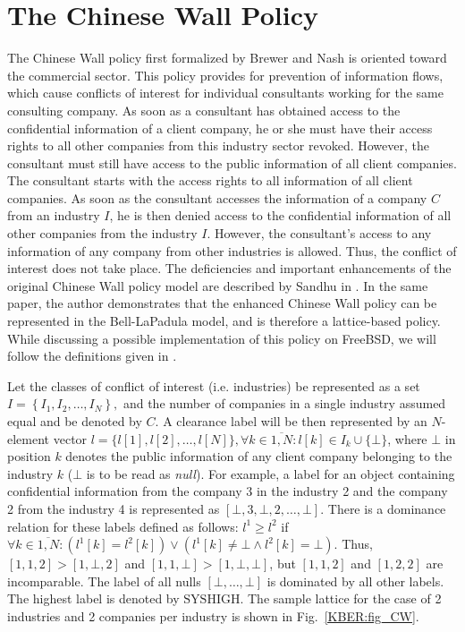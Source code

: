 \documentclass[10pt,a4paper,conference,onecolumn]{IEEEtran}
\newcommand{\KBERcode}[1]{\textsl{#1}}
\begin{document}
\section{The Chinese Wall Policy}

The Chinese Wall policy first formalized by Brewer and Nash \cite{DBLP:conf/sp/BrewerN89}
is oriented toward the commercial sector. This policy provides for prevention of
information flows, which cause conflicts of interest for individual consultants
working for the same consulting company. As soon as a consultant has obtained
access to the confidential information of a client company, he or she must 
have their access rights to all other companies from this industry sector 
revoked. However, the consultant must still have access to the public 
information of all client companies. The consultant starts with the access
rights to all information of all client companies. As soon as the consultant
accesses the information of a company $C$ from an industry $I$, he is then
denied access to the confidential information of all other companies from the
industry $I$. However, the consultant's access to any information of any
company from other industries is allowed. Thus, the conflict of interest does not take 
place. The deficiencies and important enhancements of the original Chinese Wall
policy model are described by Sandhu in \cite{DBLP:journals/compsec/Sandhu92}. In the same paper,
the author demonstrates that the enhanced Chinese Wall policy can be 
represented in the Bell-LaPadula model, and is therefore a lattice-based
policy. While discussing a possible implementation of this policy on FreeBSD,
we will follow the definitions given in \cite{DBLP:journals/computer/Sandhu93}.

Let the classes of conflict of interest (i.e. industries) be represented 
as a set $I=\left\{I_1, I_2, \ldots, I_N\right\},$ and the number of 
companies in a single industry assumed equal and be denoted by $C$. 
A clearance label will be then represented by an $N$-element vector 
$l=\{l[1], l[2], \ldots, l[N]\}, \forall{}k\in \overline{1,N}: l[k]\in I_k\cup \{\bot\}$, 
where $\bot$ in position $k$ denotes the public information of any client company 
belonging to the industry $k$ ($\bot$ is to be read as \KBERcode{null}). For example, a label for an object containing
confidential information from the company 3 in the industry 2 and the company 2 from 
the industry 4 is represented as $\left[\bot,3,\bot,2,\ldots,\bot\right]$.
There is a dominance relation for these labels defined as follows:
$l^1\geq{}l^2$ if
$\forall{}k\in\overline{1,N}:\left(l^1[k]=l^2[k]\right) \vee \left(l^1[k]\neq\bot \wedge l^2[k]=\bot\right).$
Thus, $\left[1,1,2\right]>\left[1,\bot,2\right]$ and $\left[1,1,\bot\right]>\left[1,\bot,\bot\right]$,
but $\left[1,1,2\right]$ and $\left[1,2,2\right]$ are incomparable. 
The label of all nulls $\left[\bot,\ldots,\bot\right]$ is dominated by all other labels.
The highest label is denoted by $\mbox{SYSHIGH}$. The sample lattice for the case of 2 industries and 2 companies 
per industry is shown in Fig.~\ref{KBER:fig_CW}.
\end{document}
